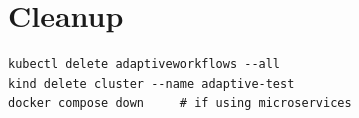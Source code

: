 \documentclass[11pt,a4paper]{article}
\begin{document}
\section{Cleanup}

\begin{lstlisting}
kubectl delete adaptiveworkflows --all
kind delete cluster --name adaptive-test
docker compose down     # if using microservices
\end{lstlisting}

\end{document}

